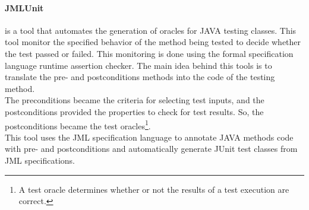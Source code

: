 \documentclass{llncs}
\begin{document}
\paragraph{\textbf{JMLUnit}\cite{Cheon04thejml}} is a tool that automates the generation of oracles for JAVA testing classes. This tool
monitor the specified behavior of the method being tested to decide whether the test passed or failed.
This monitoring is done using the formal specification language runtime assertion checker.
The main idea behind this tools is to translate the pre- and postconditions methods into the code of the testing method.\\
The preconditions became the criteria for selecting test inputs, and the postconditions provided the properties to check for
test results. So, the postconditions became the test oracles\footnote{A test oracle determines whether or not the results of a test
execution are correct\cite{Peters95generatinga}.}.\\
This tool uses the JML\cite{Burdy03anoverview} specification language to annotate JAVA methods code with pre- and postconditions and
automatically generate JUnit test classes from JML specifications.

\end{document}
